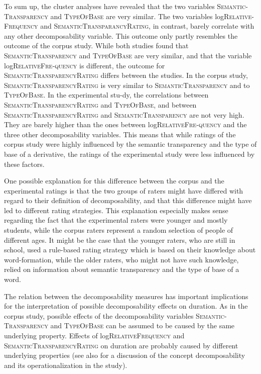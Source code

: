  
 To sum up, the cluster analyses have revealed that the two variables \textsc{Semantic-Transparency} and \textsc{TypeOfBase} are very similar. The two variables log\textsc{Relative- Frequency} and \textsc{SemanticTransparancyRating}, in contrast, barely correlate with any other decomposability variable.
This outcome only partly resembles the outcome of the corpus study. While both studies found that \textsc{SemanticTransparency} and \textsc{TypeOfBase} are very similar, and that the variable log\textsc{RelativeFre-quency} is different, the outcome for \textsc{SemanticTransparencyRating} differs between the studies. 
In the corpus study, \textsc{SemanticTransparencyRating} is very similar to \textsc{SemanticTransparency} and to \textsc{TypeOfBase}. In the experimental stu-dy, the correlations between \textsc{SemanticTransparencyRating} and \textsc{TypeOfBase}, and between \textsc{SemanticTransparencyRating}  and \textsc{SemanticTransparency} are not very high. They are barely higher than the ones between log\textsc{RelativeFre-quency} and the three other decomposability variables. 
This means that while ratings of the corpus study were highly influenced by the semantic transparency and the type of base of a derivative, the ratings of the experimental study were less influenced by these factors.

 
 One possible explanation for this difference between the corpus and the experimental ratings is that the two groups of raters might have differed with regard to their definition of decomposability, and that this difference might have led to different rating strategies. This explanation especially makes sense regarding the fact that the experimental raters were younger and mostly students, while the corpus raters represent a random selection of people of different ages. It might be the case that the younger raters, who are still in school, used a rule-based rating strategy which is based on their knowledge about word-formation, while the older raters, who might not have such knowledge, relied on information about semantic transparency and the type of base of a word. 

 The relation between the decomposability measures has important implications for the interpretation of possible decomposability effects on duration. As in the corpus study, possible effects of the decomposability variables \textsc{Semantic-Transparency} and \textsc{TypeOfBase} can be assumed to be caused by the same underlying property. 
 Effects of log\textsc{RelativeFrequency} and \textsc{SemanticTransparencyRating} on duration are probably caused by different underlying properties (see also  for a discussion of the concept decomposability and its operationalization in the study).
 





